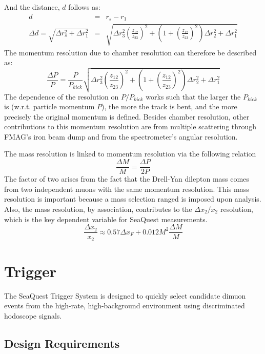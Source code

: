 And the distance, $d$ follows as:
\begin{eqnarray}
d & = & r_s - r_1 \\
\Delta d = \sqrt{\Delta r_s^2 + \Delta r_1^2} & = & \sqrt{ \Delta r_3^2 \left(\frac{z_{12}}{z_{23}}\right)^2 + (1 + \left( \frac{z_{12}}{z_{23}} \right)^2) \Delta r_2^2 + \Delta r_1^2}
\end{eqnarray}
The momentum resolution due to chamber resolution can therefore be described as:
\begin{equation}
\frac{\Delta P}{P} = \frac{P}{P_{kick}} \sqrt{ \Delta r_3^2 \left(\frac{z_{12}}{z_{23}}\right)^2 + \left(1 + \left( \frac{z_{12}}{z_{23}} \right)^2 \right) \Delta r_2^2 + \Delta r_1^2}
\end{equation}
The dependence of the resolution on $P/P_{kick}$ works such that the larger the $P_{kick}$ is (w.r.t. particle momentum $P$), the more the track is bent, and the more precisely the original momentum is defined. Besides chamber resolution, other contributions to this momentum resolution are from multiple scattering through FMAG's iron beam dump and from the spectrometer's angular resolution.

The mass resolution is linked to momentum resolution via the following relation
\begin{equation}
\frac{\Delta M}{M} = \frac{\Delta P}{2 P}
\end{equation}
The factor of two arises from the fact that the Drell-Yan dilepton mass comes from two independent muons with the same momentum resolution. This mass resolution is important because a mass selection ranged is imposed upon analysis. Also, the mass resolution, by association, contributes to the $\Delta x_2 / x_2$ resolution, which is the key dependent variable for SeaQuest measurements.
\begin{equation}
\frac{\Delta x_2}{x_2} \approx 0.57 \Delta x_F + 0.012 M^2 \frac{\Delta M}{M}
\end{equation}

\section{Trigger}

The SeaQuest Trigger System is designed to quickly select candidate dimuon events from the high-rate, high-background environment using discriminated hodoscope signals.

\subsection{Design Requirements}

